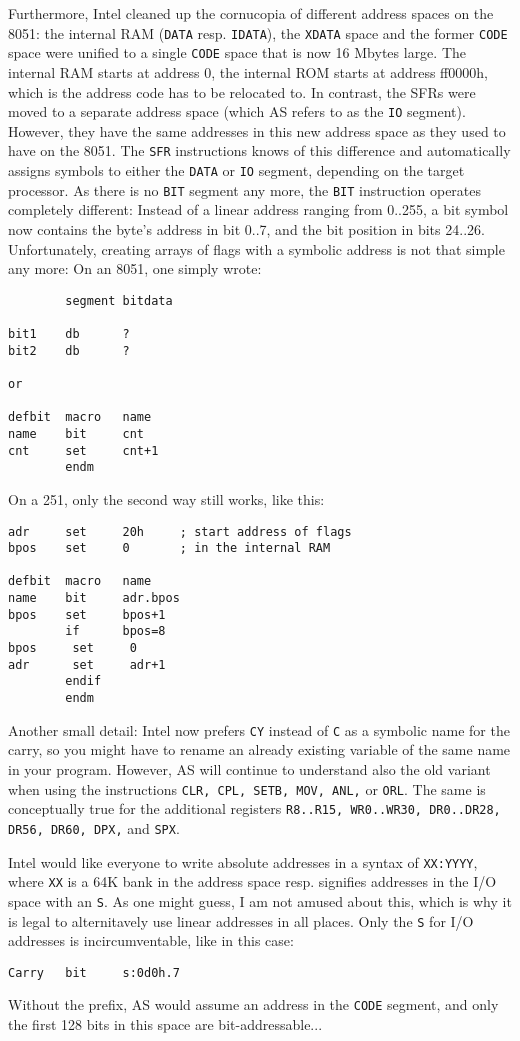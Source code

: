 \documentclass[12pt,twoside]{report}
\newcommand{\tty}[1]{{\tt #1}}
\begin{document}
Furthermore, Intel cleaned up the cornucopia of different address
spaces on the 8051: the internal RAM (\tty{DATA} resp. \tty{IDATA}), the
\tty{XDATA} space and the former \tty{CODE} space were unified to a single
\tty{CODE} space that is now 16 Mbytes large.  The internal RAM starts at
address 0, the internal ROM starts at address ff0000h, which is the
address code has to be relocated to.  In contrast, the SFRs were moved to
a separate address space (which AS refers to as the \tty{IO} segment).
However, they have the same addresses in this new address space as they
used to have on the 8051.  The \tty{SFR} instructions knows of this
difference and automatically assigns symbols to either the \tty{DATA} or
\tty{IO} segment, depending on the target processor.  As there is no
\tty{BIT} segment any more, the \tty{BIT} instruction operates completely
different: Instead of a linear address ranging from 0..255, a bit symbol
now contains the byte's address in bit 0..7, and the bit position in bits
24..26.  Unfortunately, creating arrays of flags with a symbolic address
is not that simple any more: On an 8051, one simply wrote:
\begin{verbatim}
        segment bitdata

bit1    db      ?
bit2    db      ?

or

defbit  macro   name
name    bit     cnt
cnt     set     cnt+1
        endm
\end{verbatim}
On a 251, only the second way still works, like this:
  \begin{verbatim}
adr     set     20h     ; start address of flags
bpos    set     0       ; in the internal RAM

defbit  macro   name
name    bit     adr.bpos
bpos    set     bpos+1
        if      bpos=8
bpos     set     0
adr      set     adr+1
        endif
        endm
\end{verbatim}
Another small detail: Intel now prefers \tty{CY} instead of \tty{C} as a
symbolic name for the carry, so you might have to rename an already
existing variable of the same name in your program.  However, AS will
continue to understand also the old variant when using the instructions
\tty{CLR, CPL, SETB, MOV, ANL,} or \tty{ORL}.  The same is conceptually
true for the additional registers \tty{R8..R15, WR0..WR30, DR0..DR28, DR56,
DR60, DPX,} and \tty{SPX}.

Intel would like everyone to write absolute addresses in a syntax of
\tty{XX:YYYY}, where \tty{XX} is a 64K bank in the address space resp.
signifies addresses in the I/O space with an \tty{S}.  As one might guess,
I am not amused about this, which is why it is legal to alternitavely use
linear addresses in all places.  Only the \tty{S} for I/O addresses is
incircumventable, like in this case:
\begin{verbatim}
Carry   bit     s:0d0h.7
\end{verbatim}
Without the prefix, AS would assume an address in the \tty{CODE} segment,
and only the first 128 bits in this space are bit-addressable...
\end{document}
